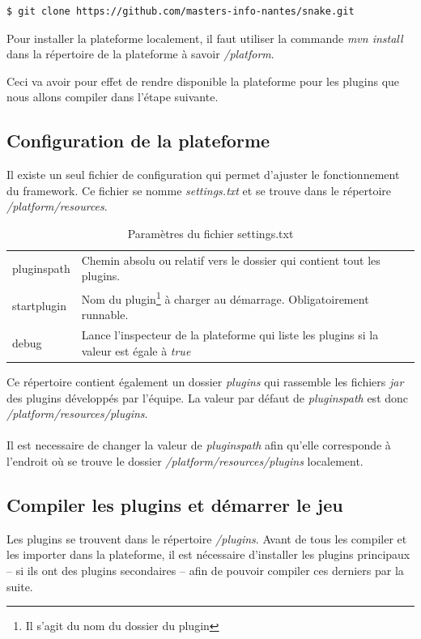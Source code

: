 \documentclass[12pt,a4paper]{article}
\begin{document}
\begin{lstlisting}[language=bash,caption=Télécharger le projet]
$ git clone https://github.com/masters-info-nantes/snake.git
\end{lstlisting}

Pour installer la plateforme localement, il faut utiliser la commande 
\og{}\emph{mvn install}\fg{} dans la répertoire de la plateforme à savoir 
\emph{/platform}.

Ceci va avoir pour effet de rendre disponible la plateforme pour les plugins 
que nous allons compiler dans l'étape suivante.

\subsection{Configuration de la plateforme}
Il existe un seul fichier de configuration qui permet d'ajuster le fonctionnement 
du framework. Ce fichier se nomme \emph{settings.txt} et se trouve dans le 
répertoire \emph{/platform/resources}.

\begin{table}[h]
\centering
	\begin{tabular}{lp{9cm}}
		pluginspath & Chemin absolu ou relatif vers le dossier qui contient tout les plugins.\\
					 
		startplugin & Nom du plugin\footnote{Il s'agit du nom du dossier du 
		plugin} à charger au démarrage. Obligatoirement runnable.\\	
		
		debug & Lance l'inspecteur de la plateforme qui liste les plugins si la valeur 
		est égale à \emph{true}				 
	\end{tabular}	
\caption{Paramètres du fichier settings.txt}
\end{table}
	
Ce répertoire contient également un dossier \emph{plugins} qui rassemble les fichiers 
\emph{jar} des plugins développés par l'équipe. La valeur par défaut de 
\emph{pluginspath} est donc \emph{/platform/resources/plugins}.
\\\\
Il est necessaire de changer la valeur de \emph{pluginspath} afin qu'elle corresponde 
à l'endroit où se trouve le dossier \emph{/platform/resources/plugins} localement.

\subsection{Compiler les plugins et démarrer le jeu}
Les plugins se trouvent dans le répertoire \emph{/plugins}. Avant de tous les compiler 
et les importer dans la plateforme, il est nécessaire d'installer les plugins 
principaux -- si ils ont des plugins secondaires -- afin de pouvoir compiler 
ces derniers par la suite.
\end{document}
